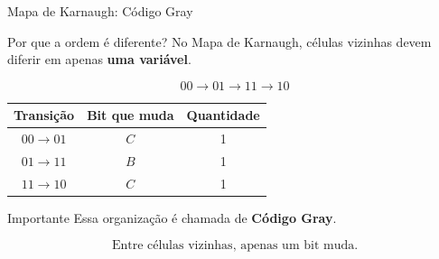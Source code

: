\begin{frame}{Mapa de Karnaugh: Código Gray}
    \small

    \begin{block}{Por que a ordem é diferente?}
        No Mapa de Karnaugh, células vizinhas devem diferir em
        apenas \textbf{uma variável}.
    \end{block}

    \[
        \boxed{00 \rightarrow 01 \rightarrow 11 \rightarrow 10}
    \]

    \begin{center}
        \begin{tabular}{c|c|c}
            Transição & Bit que muda & Quantidade \\ \hline
            $00 \rightarrow 01$ & $C$ & 1 \\
            $01 \rightarrow 11$ & $B$ & 1 \\
            $11 \rightarrow 10$ & $C$ & 1
        \end{tabular}
    \end{center}

    \vspace{0.3cm}

    \begin{alertblock}{Importante}
        Essa organização é chamada de \textbf{Código Gray}.

        \[
            \boxed{\text{Entre células vizinhas, apenas um bit muda.}}
        \]
    \end{alertblock}

\end{frame}